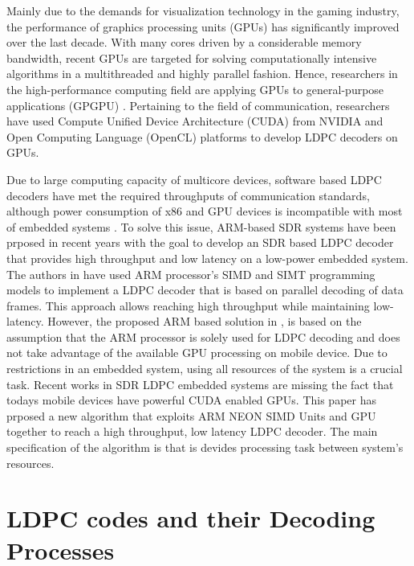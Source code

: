 \documentclass[conference]{IEEEtran}
\begin{document}
Mainly due to the demands for visualization technology in the gaming industry, the performance of graphics processing units (GPUs) has significantly improved over the last decade. With many cores driven by a considerable memory bandwidth, recent GPUs are targeted for solving computationally intensive algorithms in a multithreaded and highly parallel fashion. Hence, researchers in the high-performance computing field are applying GPUs to general-purpose applications (GPGPU) \cite{art_gpu_0,art_cuda_openmp, art_memory_coalesced, art_ldpc_OpenCl, art_optimize_0, art_layered1}. Pertaining to the field of communication, researchers have used Compute Unified Device Architecture (CUDA) from NVIDIA \cite{website_cuda} and Open Computing Language (OpenCL) platforms to develop LDPC decoders on GPUs.

Due to large computing capacity of multicore devices, software based LDPC decoders have met the required throughputs of communication standards, although power consumption of x86 and GPU devices is incompatible with most of embedded systems \cite{art_neon}. To solve this issue, ARM-based SDR systems have been prposed in recent years \cite{art_neon, art_ldpc_cpu0, art_ldpc_OpenCl_1} with the goal to develop an SDR based LDPC decoder that provides high throughput and low latency on a low-power embedded system. The authors in \cite{art_neon} have used ARM processor's SIMD and SIMT programming models to implement a LDPC decoder that is based on parallel decoding of data frames. This approach allows reaching high throughput while maintaining low-latency. However, the proposed ARM based solution in \cite{art_neon}, is based on the assumption that the ARM processor is solely used for LDPC decoding and does not take advantage of the available GPU processing on mobile device. Due to restrictions in an embedded system, using all resources of the system is a crucial task. Recent works in SDR LDPC embedded systems are missing the fact that todays mobile devices have powerful CUDA enabled GPUs. This paper has prposed a new algorithm that exploits ARM NEON SIMD Units and GPU together to reach a high throughput, low latency LDPC decoder. The main specification of the algorithm is that is devides processing task between system's resources. 

\section{LDPC codes and their Decoding Processes}
\end{document}

